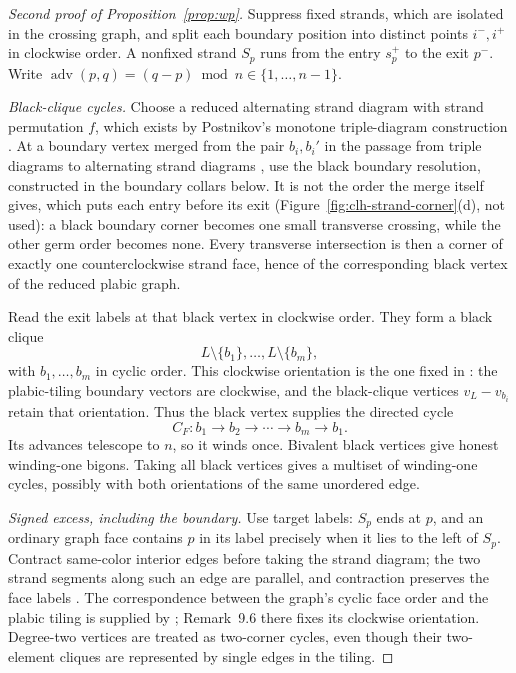 \documentclass[11pt]{article}
\theoremstyle{definition}
\begin{document}
\begin{proof}[Second proof of Proposition~\ref{prop:wp}]
Suppress fixed strands, which are isolated in the crossing graph, and split each
boundary position into distinct points $i^-,i^+$ in clockwise order.  A nonfixed
strand $S_p$ runs from the entry $s_p^+$ to the exit $p^-$.  Write
$\operatorname{adv}(p,q)=(q-p)\bmod n\in\{1,\ldots,n-1\}$.

\emph{Black-clique cycles.}  Choose a reduced alternating strand diagram with
strand permutation $f$, which exists by Postnikov's monotone triple-diagram
construction \cite[Lem.~14.6, Cor.~14.7 with Cor.~14.2]{Postnikov}.  At a boundary vertex merged
from the pair $b_i,b_i'$ in the passage from triple diagrams to alternating strand diagrams
\cite[the map $T\mapsto D$ after Def.~14.3, and Lem.~14.4]{Postnikov}, use the black boundary
resolution, constructed in the boundary collars below. It is not the order the merge itself gives, which
puts each entry before its exit (Figure~\ref{fig:clh-strand-corner}(d), not used):
a black boundary corner becomes one small transverse crossing, while the other germ order becomes none.  Every transverse intersection is then a corner of exactly
one counterclockwise strand face, hence of the corresponding black vertex of
the reduced plabic graph.

Read the exit labels at that black vertex in clockwise order.  They form a black
clique
\[
   L\setminus\{b_1\},\ldots,L\setminus\{b_m\},
\]
with $b_1,\ldots,b_m$ in cyclic order.  This clockwise orientation is the one
fixed in \cite[Rem.~9.6, with Thm.~9.12 and the two remarks after it]{OPS}: the plabic-tiling boundary
vectors are clockwise,
and the black-clique vertices $v_L-v_{b_i}$ retain that orientation.  Thus the
black vertex supplies the directed cycle
\[
   C_F:b_1\longrightarrow b_2\longrightarrow\cdots
       \longrightarrow b_m\longrightarrow b_1.
\]
Its advances telescope to $n$, so it winds once.  Bivalent black vertices give
honest winding-one bigons.  Taking all black vertices gives a multiset of
winding-one cycles, possibly with both orientations of the same unordered edge.

\emph{Signed excess, including the boundary.}
Use target labels: $S_p$ ends at $p$, and an ordinary graph face contains $p$
in its label precisely when it lies to the left of $S_p$.
Contract same-color interior edges before taking the strand diagram; the two
strand segments along such an edge are parallel, and contraction preserves
the face labels \cite[\S6]{OPS}.
The correspondence between the graph's cyclic face order and the plabic
tiling is supplied by \cite[Thm.~9.12 and the following two remarks]{OPS};
Remark~9.6 there fixes its clockwise orientation. Degree-two vertices are
treated as two-corner cycles, even though their two-element cliques are
represented by single edges in the tiling.


\end{proof}
\end{document}
